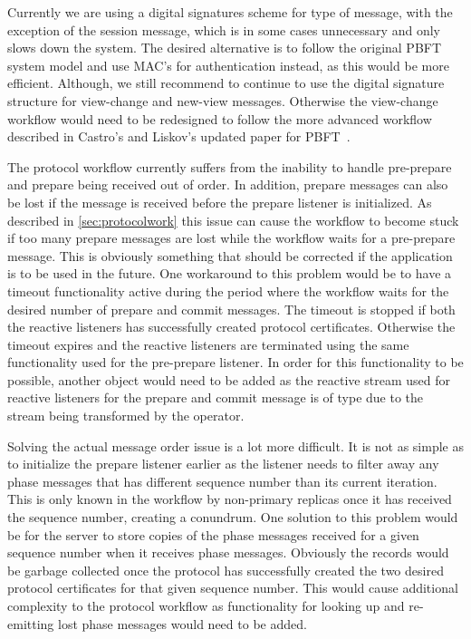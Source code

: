 Currently we are using a digital signatures scheme for type of message, with the exception of the session message, which is in some cases unnecessary and only slows down the system. The desired alternative is to follow the original PBFT system model and use MAC's for authentication instead, as this would be more efficient. Although, we still recommend to continue to use the digital signature structure for view-change and new-view messages. Otherwise the view-change workflow would need to be redesigned to follow the more advanced workflow described in Castro's and Liskov's updated paper for PBFT~\cite[p.~410-414]{PAPER:PBFTRecovery}.

The protocol workflow currently suffers from the inability to handle pre-prepare and prepare being received out of order. In addition, prepare messages can also be lost if the message is received before the prepare listener is initialized. As described in \autoref{sec:protocolwork} this issue can cause the workflow to become stuck if too many prepare messages are lost while the workflow waits for a pre-prepare message. This is obviously something that should be corrected if the application is to be used in the future. One workaround to this problem would be to have a timeout functionality active during the period where the workflow waits for the desired number of prepare and commit messages. The timeout is stopped if both the reactive listeners has successfully created protocol certificates. Otherwise the timeout expires and the reactive listeners are terminated using the same functionality used for the pre-prepare listener. In order for this functionality to be possible, another  object would need to be added as the reactive stream used for reactive listeners for the prepare and commit message is of type  due to the stream being transformed by the  operator.

Solving the actual message order issue is a lot more difficult. It is not as simple as to initialize the prepare listener earlier as the listener needs to filter away any phase messages that has different sequence number than its current iteration. This is only known in the workflow by non-primary replicas once it has received the sequence number, creating a conundrum. One solution to this problem would be for the server to store copies of the phase messages received for a given sequence number when it receives phase messages. Obviously the records would  be garbage collected once the protocol has successfully created the two desired protocol certificates for that given sequence number. This would cause additional complexity to the protocol workflow as functionality for looking up and re-emitting lost phase messages would need to be added. 

